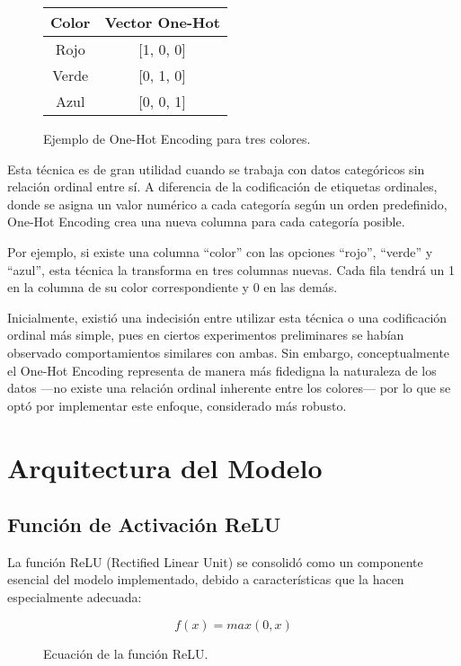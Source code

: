 \begin{figure}[h!]
    \centering
    \begin{tabular}{c|c}
        Color & Vector One-Hot \\
        \hline
        Rojo & [1, 0, 0] \\
        Verde & [0, 1, 0] \\
        Azul & [0, 0, 1]
    \end{tabular}
    \caption{Ejemplo de One-Hot Encoding para tres colores.}
    \label{fig:one_hot_encoding}
\end{figure}

Esta técnica es de gran utilidad cuando se trabaja con datos categóricos sin relación ordinal entre sí. A diferencia de la codificación de etiquetas ordinales, donde se asigna un valor numérico a cada categoría según un orden predefinido, One-Hot Encoding crea una nueva columna para cada categoría posible.

Por ejemplo, si existe una columna \textquotedblleft color\textquotedblright{} con las opciones \textquotedblleft rojo\textquotedblright{}, \textquotedblleft verde\textquotedblright{} y \textquotedblleft azul\textquotedblright{}, esta técnica la transforma en tres columnas nuevas. Cada fila tendrá un 1 en la columna de su color correspondiente y 0 en las demás.

Inicialmente, existió una indecisión entre utilizar esta técnica o una codificación ordinal más simple, pues en ciertos experimentos preliminares se habían observado comportamientos similares con ambas. Sin embargo, conceptualmente el One-Hot Encoding representa de manera más fidedigna la naturaleza de los datos —no existe una relación ordinal inherente entre los colores— por lo que se optó por implementar este enfoque, considerado más robusto.

\section{Arquitectura del Modelo}

\subsection{Función de Activación ReLU}
La función ReLU (Rectified Linear Unit) se consolidó como un componente esencial del modelo implementado, debido a características que la hacen especialmente adecuada:

\begin{figure}[h!]
    \centering
    \begin{equation}
        f(x) = max(0, x)
    \end{equation}
    \caption{Ecuación de la función ReLU.}
    \label{fig:relu_equation}
\end{figure}

